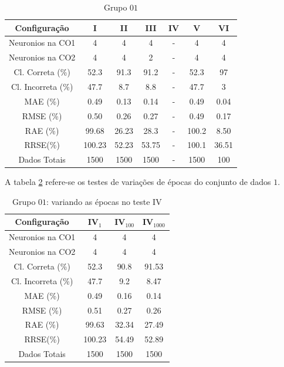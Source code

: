 \documentclass[journal, a4paper]{IEEEtran}
\begin{document}
\begin{table}[H]
	\begin{center}
				\caption{Grupo $01$}
				\label{grupo01}
				\begin{tabular}{|c|c|c|c|c|c|c|}\hline	
					\textbf{Configuração} &\textbf{I}&\textbf{II}&\textbf{III}&\textbf{IV}&\textbf{V}&\textbf{VI} \\ \hline 
					{Neuronios na CO1} & 4 & 4 & 4 & - & 4 & 4 \\ \hline
					{Neuronios na CO2} & 4 & 4 & 2 & - & 4 & 4 \\ \hline
					{Cl. Correta (\%)} & 52.3 & 91.3 & 91.2  & - & 52.3 &  97 \\ \hline
					{Cl. Incorreta (\%)} & 47.7 & 8.7 & 8.8 & - & 47.7 & 3 \\ \hline
					{MAE (\%)} & 0.49 &  0.13 & 0.14 & - & 0.49 & 0.04 \\ \hline
					{RMSE (\%)} & 0.50 & 0.26 & 0.27 & - & 0.49 & 0.17 \\ \hline
					{RAE (\%)} & 99.68 & 26.23 & 28.3 & - & 100.2 & 8.50 \\ \hline
					{RRSE(\%)} & 100.23 & 52.23 & 53.75 & - & 100.1 & 36.51 \\ \hline
					{Dados Totais} & 1500 & 1500  & 1500 & - & 1500 & 100 \\ \hline
				\end{tabular}  
	\end{center}
\end{table}

A tabela \ref{grupo01IV} refere-se os testes de variações de épocas do conjunto de dados $1$.

\begin{table}[H]
	\begin{center}
		\caption{Grupo $01$: variando as épocas no teste IV}
		\label{grupo01IV}
		\begin{tabular}{|c|c|c|c|}\hline	
			\textbf{Configuração} &$\textbf{IV}_{1}$&$\textbf{IV}_{100}$&$\textbf{IV}_{1000}$ \\ \hline 
			{Neuronios na CO1}   & 4      & 4     & 4      \\ \hline
			{Neuronios na CO2}   & 4      & 4     & 4      \\ \hline
			{Cl. Correta (\%)}   & 52.3   & 90.8  & 91.53  \\ \hline
			{Cl. Incorreta (\%)} & 47.7   & 9.2   & 8.47   \\ \hline
			{MAE (\%)}           & 0.49   & 0.16  & 0.14   \\ \hline
			{RMSE (\%)}          & 0.51   & 0.27  & 0.26   \\ \hline
			{RAE (\%)}           & 99.63  & 32.34 & 27.49   \\ \hline
			{RRSE(\%)}           & 100.23 & 54.49 & 52.89  \\ \hline
			{Dados Totais}       & 1500   & 1500  & 1500   \\ \hline
		\end{tabular}  
	\end{center}
\end{table}
\end{document}

